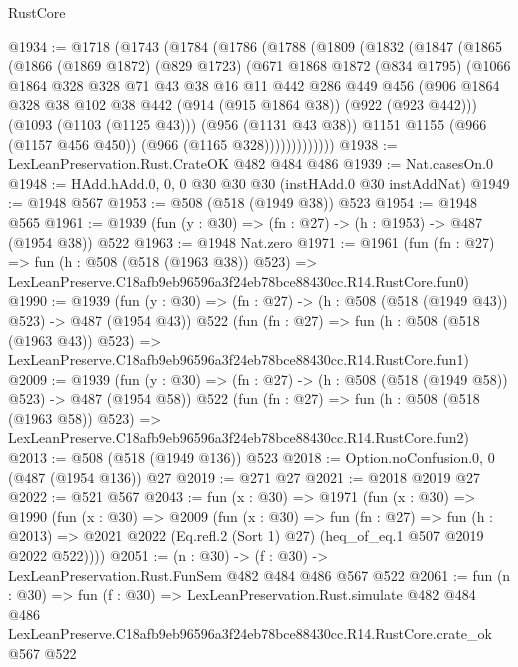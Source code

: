 \begin{lexlean}{RustCore}
\begin{coremodule}
@1934 := @1718
    (@1743
      (@1784
        (@1786
          (@1788
            (@1809
              (@1832
                (@1847
                  (@1865
                    (@1866
                      (@1869 @1872)
                      (@829 @1723)
                      (@671
                        @1868
                        @1872
                        (@834 @1795)
                        (@1066
                          @1864
                          @328
                          @328
                          @71
                          @43
                          @38
                          @16
                          @11
                          @442
                          @286
                          @449
                          @456
                          (@906
                            @1864
                            @328
                            @38
                            @102
                            @38
                            @442
                            (@914 (@915 @1864 @38))
                            (@922 (@923 @442)))
                          (@1093 (@1103 (@1125 @43)))
                          (@956 (@1131 @43 @38))
                          @1151
                          @1155
                          (@966 (@1157 @456 @450))
                          (@966 (@1165 @328)))))))))))))
@1938 := LexLeanPreservation.Rust.CrateOK @482 @484 @486
@1939 := Nat.casesOn.{0}
@1948 := HAdd.hAdd.{0, 0, 0} @30 @30 @30 (instHAdd.{0} @30 instAddNat)
@1949 := @1948 @567
@1953 := @508 (@518 (@1949 @38)) @523
@1954 := @1948 @565
@1961 := @1939 (fun (y : @30) => (fn : @27) -> (h : @1953) -> @487 (@1954 @38)) @522
@1963 := @1948 Nat.zero
@1971 := @1961
    (fun (fn : @27) =>
    fun (h : @508 (@518 (@1963 @38)) @523) =>
    LexLeanPreserve.C18afb9eb96596a3f24eb78bce88430cc.R14.RustCore.fun0)
@1990 := @1939
    (fun (y : @30) => (fn : @27) -> (h : @508 (@518 (@1949 @43)) @523) -> @487 (@1954 @43))
    @522
    (fun (fn : @27) =>
    fun (h : @508 (@518 (@1963 @43)) @523) =>
    LexLeanPreserve.C18afb9eb96596a3f24eb78bce88430cc.R14.RustCore.fun1)
@2009 := @1939
    (fun (y : @30) => (fn : @27) -> (h : @508 (@518 (@1949 @58)) @523) -> @487 (@1954 @58))
    @522
    (fun (fn : @27) =>
    fun (h : @508 (@518 (@1963 @58)) @523) =>
    LexLeanPreserve.C18afb9eb96596a3f24eb78bce88430cc.R14.RustCore.fun2)
@2013 := @508 (@518 (@1949 @136)) @523
@2018 := Option.noConfusion.{0, 0} (@487 (@1954 @136)) @27
@2019 := @271 @27
@2021 := @2018 @2019 @27
@2022 := @521 @567
@2043 := fun (x : @30) =>
  @1971
    (fun (x : @30) =>
    @1990
      (fun (x : @30) =>
      @2009
        (fun (x : @30) =>
        fun (fn : @27) =>
        fun (h : @2013) =>
        @2021 @2022 (Eq.refl.{2} (Sort 1) @27) (heq_of_eq.{1} @507 @2019 @2022 @522))))
@2051 := (n : @30) -> (f : @30) -> LexLeanPreservation.Rust.FunSem @482 @484 @486 @567 @522
@2061 := fun (n : @30) =>
  fun (f : @30) =>
  LexLeanPreservation.Rust.simulate
    @482
    @484
    @486
    LexLeanPreserve.C18afb9eb96596a3f24eb78bce88430cc.R14.RustCore.crate_ok
    @567
    @522
\end{coremodule}
\end{lexlean}
